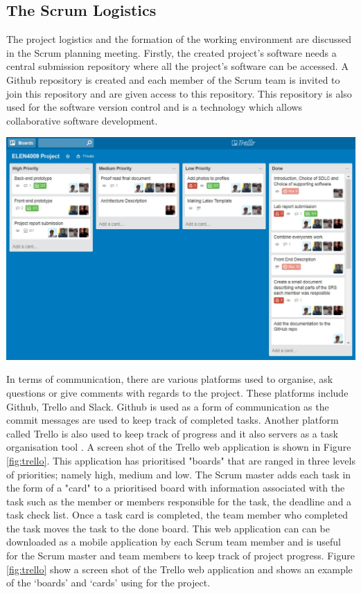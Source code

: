 \documentclass[12pt,onecolumn]{article}
\begin{document}
	\subsection{The Scrum Logistics} \label{log}
	The project logistics and the formation of the working environment are discussed in the Scrum planning meeting. Firstly, the created project's software needs a central submission repository where all the project's software can be accessed. A Github repository is created and each member of the Scrum team is invited to join this repository and are given access to this repository. This repository is also used for the software version control and is a technology which allows collaborative software development.
		
	\begin{center}
		\includegraphics[width=\textwidth]{trello}
		 \label{fig:trello}
	\end{center}
	In terms of communication, there are various platforms used to organise, ask questions or give comments with regards to the project. These platforms include Github, Trello and Slack. Github is used as a form of communication as the commit messages are used to keep track of completed tasks. Another platform called Trello is also used to keep track of progress and it also servers as a task organisation tool \cite{trello}. A screen shot of the Trello web application is shown in Figure \ref{fig:trello}. This application has prioritised "boards" that are ranged in three levels of priorities; namely high, medium and low. The Scrum master adds each task in the form of a "card" to a prioritised board with information associated with the task such as the member or members responsible for the task, the deadline and a task check list. Once a task card is completed, the team member who completed the task moves the task to the done board. This web application can can be downloaded as a mobile application by each Scrum team member and is useful for the Scrum master and team members to keep track of project progress. Figure \ref{fig:trello} show a screen shot of the Trello web application and shows an example of the `boards' and `cards' using for the project.
	
\end{document}
